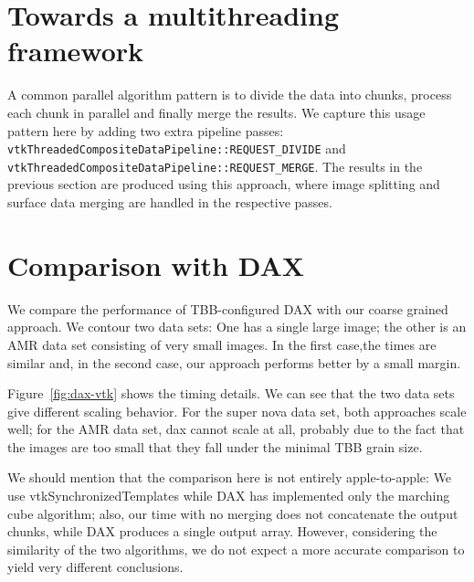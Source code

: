 \documentclass{article}
\begin{document}
\section{Towards a multithreading framework}

A common parallel algorithm pattern is to divide the data into chunks,
process each chunk in parallel and finally merge the results. We
capture this usage pattern here by adding two extra pipeline passes:
{\tt vtkThreadedCompositeDataPipeline::REQUEST\_DIVIDE} and {\tt
  vtkThreadedCompositeDataPipeline::REQUEST\_MERGE}.  The results in
the previous section are produced using this approach, where image
splitting and surface data merging are handled in the respective
passes.

\section{Comparison with DAX}

We compare the performance of TBB-configured DAX with our
coarse grained approach. We contour two data sets: One has a single
large image; the other is an AMR data set consisting of very small
images. In the first case,the times are similar and, in the second
case, our approach performs better by a small margin.

Figure~\ref{fig:dax-vtk} shows the timing details. We can see that the
two data sets give different scaling behavior. For the super nova data
set, both approaches scale well; for the AMR data set, dax cannot
scale at all, probably due to the fact that the images are too small
that they fall under the minimal TBB grain size.

We should mention that the comparison here is not entirely
apple-to-apple: We use vtkSynchronizedTemplates while DAX has
implemented only the marching cube algorithm; also, our time with no
merging does not concatenate the output chunks, while DAX produces a
single output array. However, considering the similarity of the two
algorithms, we do not expect a more accurate comparison to yield very
different conclusions.
\end{document}
